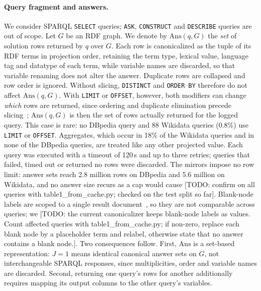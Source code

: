 \documentclass[runningheads]{llncs}
\newcommand{\Ans}{\mathrm{Ans}}
\newcommand{\hp}[1]{{\color{red!75!black}#1}}
\begin{document}
\paragraph{Query fragment and answers.}
We consider SPARQL \texttt{SELECT} queries; \texttt{ASK}, \texttt{CONSTRUCT}
and \texttt{DESCRIBE} queries are out of scope. Let $G$ be an RDF graph. We
denote by $\Ans(q,G)$ the \emph{set} of solution rows returned by $q$ over
$G$. Each row is canonicalized as the tuple of its RDF terms in projection
order, retaining the term type, lexical value, language tag and datatype of
each term, while variable names are discarded, so that variable renaming does
not alter the answer. Duplicate rows are collapsed and row order is ignored.
Without slicing, \texttt{DISTINCT} and \texttt{ORDER BY} therefore do not
affect $\Ans(q,G)$. With \texttt{LIMIT} or \texttt{OFFSET}, however, both
modifiers can change \emph{which} rows are returned, since ordering and
duplicate elimination precede slicing~\cite{w3c2013sparql11}; $\Ans(q,G)$ is
then the set of rows actually returned for the logged query. This case is
rare: no DBpedia query and 88 Wikidata queries (0.8\%) use \texttt{LIMIT} or
\texttt{OFFSET}. Aggregates, which occur in 18\% of the Wikidata queries and in
none of the DBpedia queries, are treated like any other projected value.
Each query was executed with a timeout of 120\,s and up to three retries;
queries that failed, timed out or returned no rows were discarded.
The mirrors impose no row limit: answer sets reach 2.8 million rows on
DBpedia and 5.6 million on Wikidata, and no answer size recurs as a cap
would cause \hp{[TODO: confirm on all queries with table1\_from\_cache.py;
checked on the test split so far]}. Blank-node labels are
scoped to a single result document~\cite{w3c2013sparqljson}, so they are not
comparable across queries; we \hp{[TODO: the current canonicalizer keeps
blank-node labels as values. Count affected queries with
table1\_from\_cache.py; if non-zero, replace each blank node by a placeholder
term and relabel, otherwise state that no answer contains a blank node.]}.
Two consequences follow. First, $\Ans$ is a set-based representation:
$J = 1$ means identical canonical answer sets on $G$, not interchangeable
SPARQL responses, since multiplicities, order and variable names are
discarded. Second, returning one query's rows for another additionally
requires mapping its output columns to the other query's variables.
\end{document}
